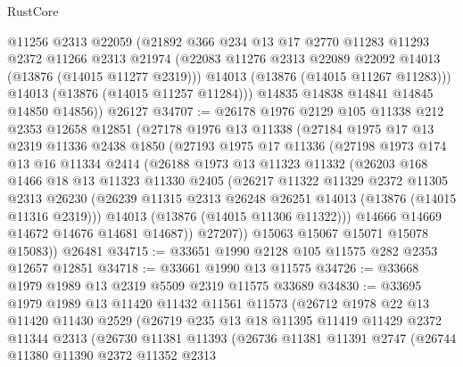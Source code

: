 \begin{lexlean}{RustCore}
\begin{coremodule}
          @11256
          @2313
          @22059
          (@21892
            @366
            @234
            @13
            @17
            @2770
            @11283
            @11293
            @2372
            @11266
            @2313
            @21974
            (@22083 @11276 @2313 @22089 @22092 @14013 (@13876 (@14015 @11277 @2319)))
            @14013
            (@13876 (@14015 @11267 @11283)))
          @14013
          (@13876 (@14015 @11257 @11284)))
        @14835
        @14838
        @14841
        @14845
        @14850
        @14856))
    @26127
@34707 := @26178
    @1976
    @2129
    @105
    @11338
    @212
    @2353
    @12658
    @12851
    (@27178
      @1976
      @13
      @11338
      (@27184
        @1975
        @17
        @13
        @2319
        @11336
        @2438
        @1850
        (@27193
          @1975
          @17
          @11336
          (@27198
            @1973
            @174
            @13
            @16
            @11334
            @2414
            (@26188
              @1973
              @13
              @11323
              @11332
              (@26203
                @168
                @1466
                @18
                @13
                @11323
                @11330
                @2405
                (@26217
                  @11322
                  @11329
                  @2372
                  @11305
                  @2313
                  @26230
                  (@26239 @11315 @2313 @26248 @26251 @14013 (@13876 (@14015 @11316 @2319)))
                  @14013
                  (@13876 (@14015 @11306 @11322)))
                @14666
                @14669
                @14672
                @14676
                @14681
                @14687))
            @27207))
        @15063
        @15067
        @15071
        @15078
        @15083))
    @26481
@34715 := @33651 @1990 @2128 @105 @11575 @282 @2353 @12657 @12851
@34718 := @33661 @1990 @13 @11575
@34726 := @33668 @1979 @1989 @13 @2319 @5509 @2319 @11575 @33689
@34830 := @33695
    @1979
    @1989
    @13
    @11420
    @11432
    @11561
    @11573
    (@26712
      @1978
      @22
      @13
      @11420
      @11430
      @2529
      (@26719
        @235
        @13
        @18
        @11395
        @11419
        @11429
        @2372
        @11344
        @2313
        (@26730
          @11381
          @11393
          (@26736
            @11381
            @11391
            @2747
            (@26744
              @11380
              @11390
              @2372
              @11352
              @2313

\end{coremodule}
\end{lexlean}
